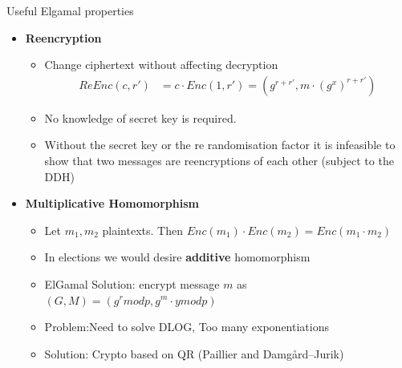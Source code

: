 \documentclass{beamer}
\begin{document}
\begin{frame}[allowframebreaks]{Useful Elgamal properties}
\begin{itemize}
\item \textbf{Reencryption}
\begin{itemize}
\item Change ciphertext without affecting decryption
\begin{align*}
 ReEnc(c,r') & = c \cdot Enc(1,r') = (g^{r+r'},m \cdot (g^x)^{r+r'}) 
\end{align*}
\item No knowledge of secret key is required.
\item Without the secret key or the re randomisation factor it is infeasible to show that two messages are reencryptions of each other (subject to the DDH)
\end{itemize}
\item \textbf{Multiplicative Homomorphism}
\begin{itemize}
\item Let $m_1, m_2$ plaintexts. Then\textbf{ $Enc(m_1) \cdot Enc(m_2) = Enc(m_1 \cdot m_2)$}
\item In elections we would desire \textbf{additive} homomorphism
\item ElGamal Solution: encrypt message $m$ as $(G,M) = (g^r mod p ,g^m \cdot y mod p)$
\item Problem:Need to solve DLOG, Too many exponentiations
\item Solution: Crypto based on QR (Paillier and Damgård–Jurik)
\end{itemize}
\end{itemize}
\end{frame}
\end{document}

